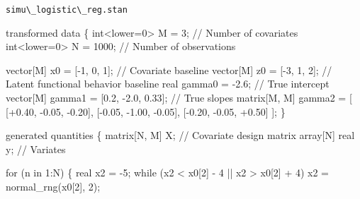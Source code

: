 \documentclass[
  letterpaper,
  DIV=11,
  numbers=noendperiod]{scrartcl}
\newenvironment{Shaded}{\begin{snugshade}}{\end{snugshade}}
\newcommand{\CommentTok}[1]{\textcolor[rgb]{0.37,0.37,0.37}{#1}}
\newcommand{\ControlFlowTok}[1]{\textcolor[rgb]{0.00,0.23,0.31}{#1}}
\newcommand{\DataTypeTok}[1]{\textcolor[rgb]{0.68,0.00,0.00}{#1}}
\newcommand{\DecValTok}[1]{\textcolor[rgb]{0.68,0.00,0.00}{#1}}
\newcommand{\FloatTok}[1]{\textcolor[rgb]{0.68,0.00,0.00}{#1}}
\newcommand{\KeywordTok}[1]{\textcolor[rgb]{0.00,0.23,0.31}{#1}}
\newcommand{\NormalTok}[1]{\textcolor[rgb]{0.00,0.23,0.31}{#1}}
\begin{document}
\begin{codelisting}

\caption{\texttt{simu\textbackslash\_logistic\textbackslash\_reg.stan}}

\begin{Shaded}
\begin{Highlighting}[]
\KeywordTok{transformed data}\NormalTok{ \{}
  \DataTypeTok{int}\NormalTok{\textless{}}\KeywordTok{lower}\NormalTok{=}\DecValTok{0}\NormalTok{\textgreater{} M = }\DecValTok{3}\NormalTok{;         }\CommentTok{// Number of covariates}
  \DataTypeTok{int}\NormalTok{\textless{}}\KeywordTok{lower}\NormalTok{=}\DecValTok{0}\NormalTok{\textgreater{} N = }\DecValTok{1000}\NormalTok{;      }\CommentTok{// Number of observations}
  
  \DataTypeTok{vector}\NormalTok{[M] x0 = [{-}}\DecValTok{1}\NormalTok{, }\DecValTok{0}\NormalTok{, }\DecValTok{1}\NormalTok{]\textquotesingle{}; }\CommentTok{// Covariate baseline}
  \DataTypeTok{vector}\NormalTok{[M] z0 = [{-}}\DecValTok{3}\NormalTok{, }\DecValTok{1}\NormalTok{, }\DecValTok{2}\NormalTok{]\textquotesingle{}; }\CommentTok{// Latent functional behavior baseline}
  \DataTypeTok{real}\NormalTok{ gamma0 = {-}}\FloatTok{2.6}\NormalTok{;                      }\CommentTok{// True intercept}
  \DataTypeTok{vector}\NormalTok{[M] gamma1 = [}\FloatTok{0.2}\NormalTok{, {-}}\FloatTok{2.0}\NormalTok{, }\FloatTok{0.33}\NormalTok{]\textquotesingle{};   }\CommentTok{// True slopes}
  \DataTypeTok{matrix}\NormalTok{[M, M] gamma2 = [ [+}\FloatTok{0.40}\NormalTok{, {-}}\FloatTok{0.05}\NormalTok{, {-}}\FloatTok{0.20}\NormalTok{],}
\NormalTok{                          [{-}}\FloatTok{0.05}\NormalTok{, {-}}\FloatTok{1.00}\NormalTok{, {-}}\FloatTok{0.05}\NormalTok{],}
\NormalTok{                          [{-}}\FloatTok{0.20}\NormalTok{, {-}}\FloatTok{0.05}\NormalTok{, +}\FloatTok{0.50}\NormalTok{] ];}
\NormalTok{\}}

\KeywordTok{generated quantities}\NormalTok{ \{}
  \DataTypeTok{matrix}\NormalTok{[N, M] X; }\CommentTok{// Covariate design matrix}
  \DataTypeTok{array}\NormalTok{[N] }\DataTypeTok{real}\NormalTok{ y;      }\CommentTok{// Variates}

  \ControlFlowTok{for}\NormalTok{ (n }\ControlFlowTok{in} \DecValTok{1}\NormalTok{:N) \{}
    \DataTypeTok{real}\NormalTok{ x2 = {-}}\DecValTok{5}\NormalTok{;}
    \ControlFlowTok{while}\NormalTok{ (x2 \textless{} x0[}\DecValTok{2}\NormalTok{] {-} }\DecValTok{4}\NormalTok{ || x2 \textgreater{} x0[}\DecValTok{2}\NormalTok{] + }\DecValTok{4}\NormalTok{)}
\NormalTok{      x2 = normal\_rng(x0[}\DecValTok{2}\NormalTok{], }\DecValTok{2}\NormalTok{);}
    

\end{Highlighting}
\end{Shaded}
\end{codelisting}
\end{document}
